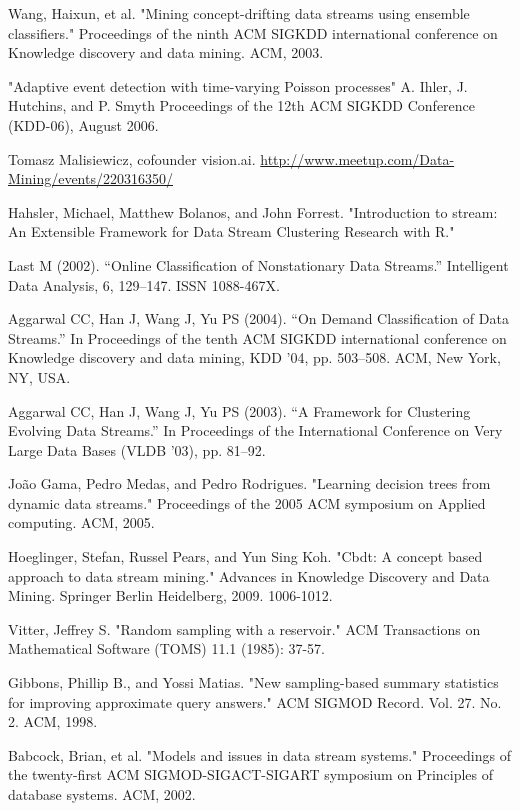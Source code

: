\documentclass[conference]{IEEEtran}
\begin{document}
\begin{thebibliography}{9}
	Wang, Haixun, et al. "Mining concept-drifting data streams using ensemble classifiers." Proceedings of the ninth ACM SIGKDD international conference on Knowledge discovery and data mining. ACM, 2003.
	
	"Adaptive event detection with time-varying Poisson processes"
	A. Ihler, J. Hutchins, and P. Smyth
	Proceedings of the 12th ACM SIGKDD Conference (KDD-06), August 2006.
	
	Tomasz Malisiewicz, cofounder vision.ai. \url{http://www.meetup.com/Data-Mining/events/220316350/}
	
	Hahsler, Michael, Matthew Bolanos, and John Forrest. "Introduction to stream: An Extensible Framework for Data Stream Clustering Research with R."
	
	Last M (2002). “Online Classification of Nonstationary Data Streams.” Intelligent Data
	Analysis, 6, 129–147. ISSN 1088-467X.
	
	Aggarwal CC, Han J, Wang J, Yu PS (2004). “On Demand Classification of Data Streams.” In
	Proceedings of the tenth ACM SIGKDD international conference on Knowledge discovery
	and data mining, KDD ’04, pp. 503–508. ACM, New York, NY, USA.
	
	Aggarwal CC, Han J, Wang J, Yu PS (2003). “A Framework for Clustering Evolving Data
	Streams.” In Proceedings of the International Conference on Very Large Data Bases (VLDB
	’03), pp. 81–92.
	
	João Gama, Pedro Medas, and Pedro Rodrigues. "Learning decision trees from dynamic data streams." Proceedings of the 2005 ACM symposium on Applied computing. ACM, 2005.
	
	Hoeglinger, Stefan, Russel Pears, and Yun Sing Koh. "Cbdt: A concept based approach to data stream mining." Advances in Knowledge Discovery and Data Mining. Springer Berlin Heidelberg, 2009. 1006-1012.
	
	Vitter, Jeffrey S. "Random sampling with a reservoir." ACM Transactions on Mathematical Software (TOMS) 11.1 (1985): 37-57.
	
	Gibbons, Phillip B., and Yossi Matias. "New sampling-based summary statistics for improving approximate query answers." ACM SIGMOD Record. Vol. 27. No. 2. ACM, 1998.
	
	Babcock, Brian, et al. "Models and issues in data stream systems." Proceedings of the twenty-first ACM SIGMOD-SIGACT-SIGART symposium on Principles of database systems. ACM, 2002.
	

\end{thebibliography}
\end{document}
